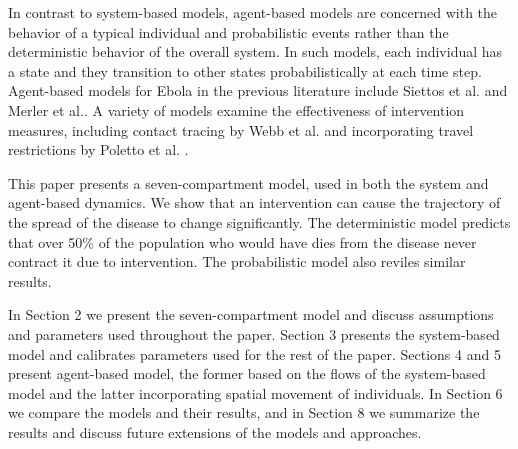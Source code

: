 In contrast to system-based models, agent-based models are concerned with the behavior of a typical individual and probabilistic events rather than the deterministic behavior of the overall system. In such models, each individual has a state and they transition to other states probabilistically at each time step. Agent-based models for Ebola in the previous literature include Siettos et al. \cite{Siettos2015} and Merler et al.\cite{Merler2015}. A variety of models examine the effectiveness of intervention measures, including contact tracing by Webb et al. \cite{Webb2015} and incorporating travel restrictions by Poletto et al. \cite{Poletto2014}.

This paper presents a seven-compartment model, used in both the system and agent-based dynamics. We show that an intervention can cause the trajectory of the spread of the disease to change significantly. The deterministic model predicts that over 50\% of the population who would have dies from the disease never contract it due to intervention. The probabilistic model also reviles similar results.

In Section 2 we present the seven-compartment model and discuss assumptions and parameters used throughout the paper. Section 3 presents the system-based model and calibrates parameters used for the rest of the paper. Sections 4 and 5 present agent-based model, the former based on the flows of the system-based model and the latter incorporating spatial movement of individuals. In Section 6 we compare the models and their results, and in Section 8 we summarize the results and discuss future extensions of the models and approaches. 